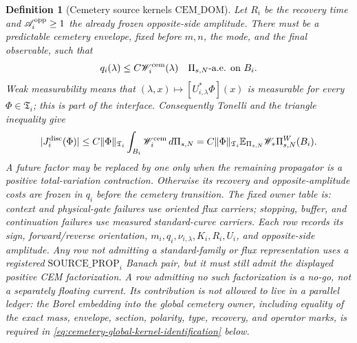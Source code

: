 \documentclass[11pt]{article}
\newtheorem{definition}[theorem]{Definition}
\begin{document}
\begin{definition}[Cemetery source kernels
$\mathrm{CEM\_DOM}$]
Let $R_i$ be the recovery time and
$\mathscr A_i^{\rm opp}\ge1$ the already frozen opposite-side amplitude.
There must be a predictable cemetery envelope, fixed before $m,n$, the mode,
and the final observable, such that
\begin{equation}
\label{eq:cemetery-kernel-domination}
 q_i(\lambda)\le C\mathscr W_i^{\rm cem}(\lambda)
 \quad\Pi_{s,N}\text{-a.e. on }B_i.
\end{equation}
Weak measurability means that
$(\lambda,x)\mapsto[U_{i,\lambda}^{*}\Phi](x)$ is measurable for every
$\Phi\in\mathfrak T_i$; this is part of the interface.  Consequently
Tonelli and the triangle inequality give
\begin{equation}
\label{eq:cemetery-current-weighted-bound}
 |J_i^{\rm disc}(\Phi)|
 \le C\|\Phi\|_{\mathfrak T_i}
       \int_{B_i}\mathscr W_i^{\rm cem}\,d\Pi_{s,N}
 =C\|\Phi\|_{\mathfrak T_i}
   \mathbb E_{\Pi_{s,N}}\mathscr W_*\Pi_{s,N}^{W}(B_i).
\end{equation}
A future factor may be replaced by one only when the remaining propagator is
a positive total-variation contraction.  Otherwise its recovery and
opposite-amplitude costs are frozen in $q_i$ before the cemetery transition.
The fixed owner table is: context and physical-gate failures use oriented
flux carriers; stopping, buffer, and continuation failures use measured
standard-curve carriers.  Each row records its sign, forward/reverse
orientation, $m_i,q_i,\nu_{i,\lambda},K_i,R_i,U_i$, and opposite-side
amplitude.
Any row not admitting a standard-family or flux representation uses a
registered $\mathrm{SOURCE\_PROP}_i$ Banach pair, but it must still admit
the displayed positive CEM factorization.  A row admitting no such
factorization is a no-go, not a separately floating current.
Its contribution is not allowed to live in a parallel ledger:
the Borel embedding into the global cemetery owner, including equality of
the exact mass, envelope, section, polarity, type, recovery, and operator
marks, is required in 
\eqref{eq:cemetery-global-kernel-identification} below.
\end{definition}
\end{document}
